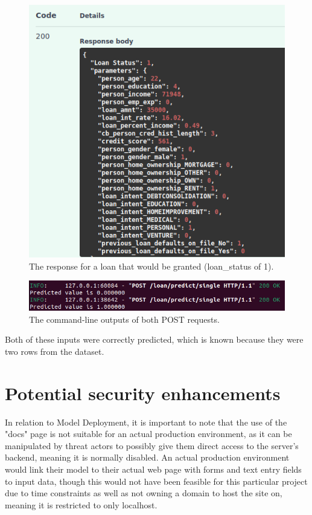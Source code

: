 \documentclass[12pt]{report}
\newcommand{\para}{\vspace{7pt}\noindent}
\begin{document}
\begin{figure}[H]
    \centering
    \includegraphics[width=\linewidth]{Implementation/FastAPI+Uvi/TruePositive.png}
    \caption{The response for a loan that would be granted (loan\_status of 1).}
    \label{fig:UviTruePositive}
\end{figure}



\begin{figure}[H]
    \centering
    \includegraphics[width=\linewidth]{Implementation/FastAPI+Uvi/TruePredictionsCLI.png}
    \caption{The command-line outputs of both POST requests.}
    \label{fig:UviCLI}
\end{figure}

\para Both of these inputs were correctly predicted, which is known because they were 
two rows from the dataset. 

\section{Potential security enhancements}\label{sec:SecurityEnhancements}
In relation to Model Deployment, it is important to note that the use of the "docs" page is not suitable for an actual production 
environment, as it can be manipulated by threat actors to possibly give them direct access to the 
server's backend, meaning it is normally disabled. An actual production environment would link their 
model to their actual web page with forms and text entry fields to input data, though this would not 
have been feasible for this particular project due to time constraints as well as not owning a domain 
to host the site on, meaning it is restricted to only localhost.
\end{document}
